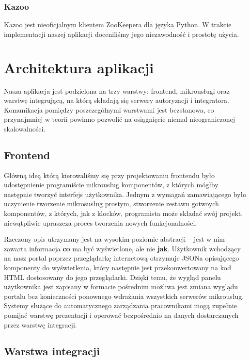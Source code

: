 \documentclass[licencjacka]{pracamgr}
\begin{document}
\subsection{Kazoo}

Kazoo \cite{kazoo} jest nieoficjalnym klientem ZooKeepera dla języka Python. W trakcie
implementacji naszej aplikacji doceniliśmy jego niezawodność i prostotę użycia.

\chapter{Architektura aplikacji}

Nasza aplikacja jest podzielona na trzy warstwy: frontend, mikrousługi oraz
warstwę integrującą, na którą składają się serwery autoryzacji i integratora.
Komunikacja pomiędzy poszczególnymi warstwami jest bezstanowa, co przynajmniej
w teorii powinno pozwolić na osiągnięcie niemal nieograniczonej skalowalności.

\section{Frontend}

Główną ideą którą kierowaliśmy się przy projektowaniu frontendu było udostępnienie
programiście mikrousług komponentów, z których mógłby następnie tworzyć interfejs
użytkownika. Jednym z wymagań zamawiającego było uczynienie tworzenie mikrosusług prostym,
stworzenie zestawu gotwoych komponentów, z których, jak z klocków, programista może
składać swój projekt, niewątpliwie upraszcza proces tworzenia nowych funkcjonalności.

Rzeczony opis utrzymany jest na wysokim poziomie abstracji --
jest w nim zawarta informacja \textbf{co} ma być wyświetlone, ale nie \textbf{jak}.
Użytkownik wchodzący na nasz portal poprzez przeglądarkę internetową otrzymuje
JSONa opisującego komponenty do wyświetlenia, który następnie jest przekonwertowany
na kod HTML dostosowany do jego przeglądarki. Dzięki temu, że wygląd panelu użytkownika
jest zapisany w formacie pośrednim możliwa jest zmiana wyglądu portalu bez
konieczności ponownego wdrażania wszystkich serwerów mikrousług.
Systemy służące do automatycznego
zarządzania pracownikami mogą zupełnie pomijać warstwę prezentacji i operować
bezpośrednio na danych dostarczanych przez warstwę integracji. 

\section{Warstwa integracji}
\end{document}
